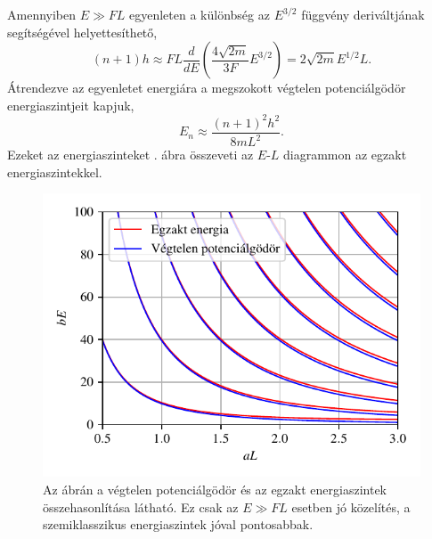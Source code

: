 Amennyiben $E \gg FL$  egyenleten a különbség az $E^{3/2}$ függvény deriváltjának segítségével helyettesíthető,
\begin{equation}
	(n+1)h \approx FL\frac{d}{dE}\left(\frac{4\sqrt{2m}}{3F}E^{3/2}\right)=2\sqrt{2m}E^{1/2}L.
\end{equation}
Átrendezve az egyenletet energiára a megszokott végtelen potenciálgödör energiaszintjeit kapjuk,
\begin{equation}
	E_n \approx \frac{(n+1)^2h^2}{8mL^2}.
\end{equation}
Ezeket az energiaszinteket . ábra összeveti az $E$-$L$ diagrammon az egzakt energiaszintekkel.
\begin{figure}[H]
	\centering
	\includegraphics[scale=1]{./figs/infsquareenergia.pdf}
	\caption[Végtelen potenciálgödör energiaszintjei]{Az ábrán a végtelen potenciálgödör és az egzakt energiaszintek összehasonlítása látható. Ez csak az $E \gg FL$ esetben jó közelítés, a szemiklasszikus energiaszintek jóval pontosabbak.}
	\label{semiclassicallevels:squarewell}
\end{figure}